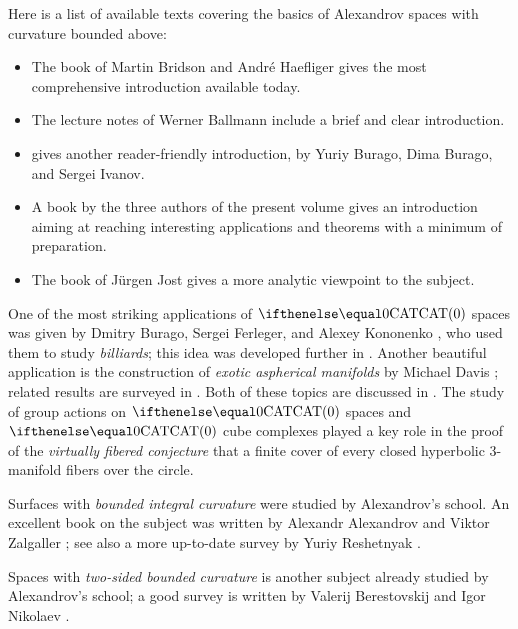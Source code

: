 Here is a list of available texts covering the basics of Alexandrov spaces with curvature bounded above: 
\begin{itemize}
\item The book of Martin Bridson and Andr\'e Haefliger \cite{bridson-haefliger} gives the most comprehensive introduction available today. 
\item The lecture notes of Werner Ballmann \cite{ballmann:lectures, ballmann:notes} include a brief 
and clear
introduction.
\item \cite[Chapter 9]{burago-burago-ivanov} gives another reader-friendly introduction, by Yuriy Burago, Dima Burago, and Sergei Ivanov.
\item A book  by the three authors of the present volume  \cite{alexander-kapovitch-petrunin-CAT} gives an introduction aiming at reaching interesting applications and theorems with a minimum of preparation.
\item The book of Jürgen Jost \cite{jost:book} gives a more analytic viewpoint to the subject.
\end{itemize}

One of the most striking applications of $\CAT0$ spaces was given by Dmitry Burago, Sergei Ferleger, and Alexey Kononenko \cite{burago-ferleger-kononenko1998-1},
who used them to study {}\emph{billiards}; this idea was developed further in \cite{burago-ferleger-kononenko1998-2,burago-ferleger-kononenko1998-3,burago-ferleger-kononenko1998-4,burago-ferleger-kononenko2000,burago-ferleger-kononenko2001}. 
Another beautiful application is the construction of {}\emph{exotic aspherical manifolds} by Michael Davis \cite{davis:aspherical}; related results are surveyed in \cite{davis:exotic,charney-davis-1995}.
Both of these topics are discussed in \cite{alexander-kapovitch-petrunin-CAT}.
The study of group actions on $\CAT 0$ spaces and $\CAT 0$ cube complexes played a key role in the proof of the {}\emph{virtually fibered conjecture} that a finite cover of  every closed hyperbolic 3-manifold fibers over the circle.

Surfaces with {}\emph{bounded integral curvature} were studied by Alexandrov's school.
An excellent book on the subject was written by Alexandr Alexandrov and Viktor Zalgaller \cite{aleksandrov-zalgaller}; see also a more up-to-date survey by Yuriy Reshetnyak \cite{reshetnyak:2D}.

Spaces with {}\emph{two-sided bounded curvature} is another subject already studied  by Alexandrov's school;
a good survey is written by Valerij Berestovskij and Igor Nikolaev \cite{berestovskii-nikolaev}.

